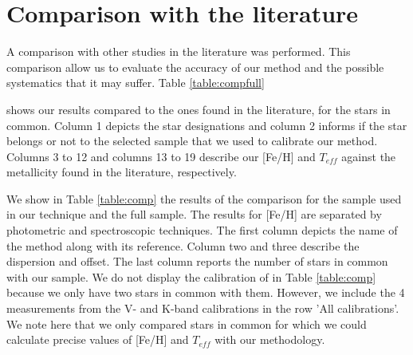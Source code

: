 \documentclass{aa}
\begin{document}
\section{Comparison with the literature}
\label{sec:comp}
A comparison with other studies in the literature was performed. This comparison allow us to evaluate the accuracy of our method and the possible systematics that it may suffer. Table \ref{table:compfull} \addtocounter{table}{1} shows our results compared to the ones found in the literature, for the stars in common. Column 1 depicts the star designations and column 2 informs if the star belongs or not to the selected sample that we used to calibrate our method. Columns 3 to 12 and columns 13 to 19 describe our [Fe/H] and $T_{eff}$ against the metallicity found in the literature, respectively. 

We show in Table \ref{table:comp} the results of the comparison for the sample used in our technique and the full sample. The results for [Fe/H] are separated by photometric and spectroscopic techniques. The first column depicts the name of the method along with its reference. Column two and three describe the dispersion and offset. The last column reports the number of stars in common with our sample. We do not display the calibration of \citet{Mann-2013a} in Table \ref{table:comp} because we only have two stars in common with them. However, we include the 4 measurements from the V- and K-band calibrations in the row 'All calibrations'. We note here that we only compared stars in common for which we could calculate precise values of [Fe/H] and $T_{eff}$ with our methodology.
\end{document}
